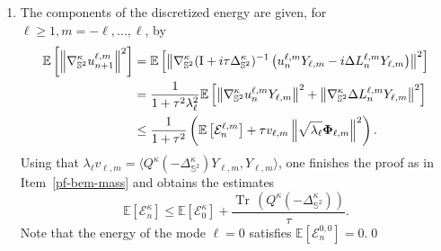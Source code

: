 \documentclass[11pt]{amsart}
\newcommand{\E}{{\mathbb E}}
\newcommand{\IS}{\mathbb{S}}
\newcommand{\tr}{{\operatorname{Tr}\, }}
\newcommand{\Id}{\text I}
\newcommand{\cE}{\mathcal E}
\providecommand{\norm}[1]{\left\lVert#1\right\rVert}
\newcommand{\Deltalb}{\Delta_{\IS^2}}
\newcommand{\nablalb}{\nabla_{\IS^{2}}}
\newcommand{\bPhi}{\mathbf{\Phi}}
\begin{document}
\begin{appendixproof}
\begin{enumerate}[label=\roman*)]
 \item The components of the discretized energy are given, for $\ell \geq 1, m = -\ell, \dots, \ell$, by
    \begin{align*}
        \E\left[\norm{\nablalb^\kappa u_{n+1}^{\ell, m}}^2\right] &= \E\left[\norm{\nablalb^\kappa(\Id + i \tau \Deltalb^\kappa)^{-1}\left(u_n^{\ell, m}Y_{\ell , m} - i\Delta L^{\ell, m}_n Y_{\ell , m}\right)}^2\right]\\
        & = \frac{1}{1 + \tau^2\lambda_\ell^2}\E\left[\norm{\nablalb^\kappa u_n^{\ell, m} Y_{\ell , m}}^2 + \norm{\nablalb^\kappa \Delta L^{\ell, m}_nY_{\ell , m}}^2\right]\\
        & \leq \frac{1}{1+\tau^2}\left(\E\left[\cE_n^{\ell, m}\right] + \tau v_{\ell, m} \norm{\sqrt{\lambda_\ell}\bPhi_{\ell, m}}^2\right).
    \end{align*}
    Using that $\lambda_\ell v_{\ell, m} = \langle Q^\kappa (-\Deltalb^\kappa) Y_{\ell , m}, Y_{\ell , m}\rangle$,
    one finishes the proof as in Item~\ref{pf-bem-mass} and obtains the estimates
    \begin{equation*}
        \E\left[\cE^\kappa_n\right] \leq \E\left[\cE^\kappa_0\right] + \frac{\tr\left(Q^\kappa(-\Deltalb^\kappa)\right)}{\tau}.
    \end{equation*}
    Note that the energy of the mode $\ell = 0$ satisfies $\E\left[\cE_n^{0, 0}\right]=0$.\qed
\end{enumerate}
\renewcommand{\qedsymbol}{}
\end{appendixproof}
\end{document}

